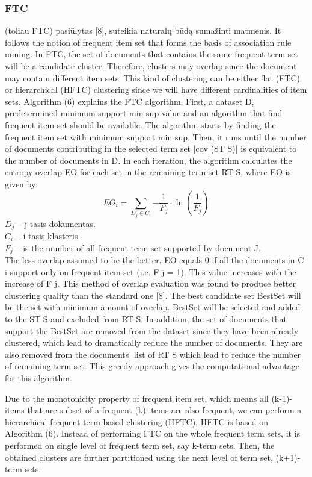\documentclass{VUMIFInfKursinis}
\begin{document}
\subsubsection{FTC}
 (toliau FTC) pasiūlytas [8], suteikia naturalų būdą sumažinti matmenis.
It follows the notion of frequent item set that forms the basis of association rule mining. In FTC, the set of documents that contains the same frequent term set will be a candidate cluster. Therefore, clusters may overlap since the document may contain different item sets. This kind of clustering can be either flat (FTC) or hierarchical (HFTC) clustering since we will have different cardinalities of item sets.
Algorithm (6) explains the FTC algorithm. First, a dataset D, predetermined minimum support min sup value and an algorithm that find frequent item set should be available. The algorithm starts by finding the frequent item set with minimum support min sup. Then, it runs until the number of documents contributing in the selected term set |cov (ST S)| is equivalent to the number of documents in D. In each iteration, the algorithm calculates the entropy overlap EO for each set in the remaining term set RT S, where EO is given by:
\begin{equation}
	EO_i=\sum_{D_j \in C_i}{-\frac{1}{F_j}\cdot\ln(\frac{1}{F_j})}
\end{equation} 
$D_j$ – j-tasis dokumentas.\\
$C_i$ – i-tasis klasteris.\\
$F_j$ – is the number of all frequent term set supported by document J.\\
The less overlap assumed to be the better. EO equals 0 if all the documents in C i support only on frequent item set (i.e. F j = 1). This value increases with the increase of F j. This method of overlap evaluation was found to produce better clustering quality than the standard one [8]. The best candidate set BestSet will be the set with minimum amount of overlap. BestSet will be selected and added to the ST S and excluded from RT S. In addition, the set of documents that support the BestSet are removed from the dataset since they have been already clustered, which lead to dramatically reduce the number of documents. They are also removed from the documents’ list of RT S which lead to reduce the number of remaining term set. This greedy approach gives the computational advantage for this algorithm.

Due to the monotonicity property of frequent item set, which means all (k-1)-items that are subset of a frequent (k)-items are also frequent, we can perform a hierarchical frequent term-based clustering (HFTC). HFTC is based on Algorithm (6). Instead of performing FTC on the whole frequent term sets, it is performed on single level of frequent term set, say k-term sets. Then, the obtained clusters are further partitioned using the next level of term set, (k+1)-term sets.
\end{document}
